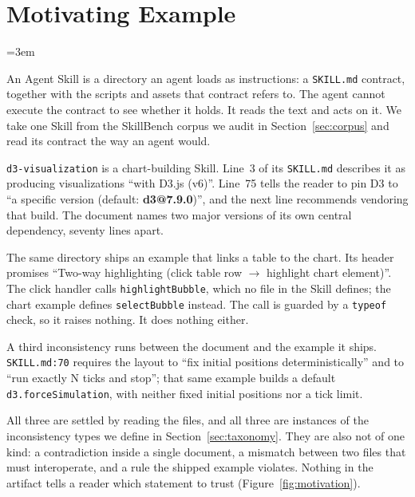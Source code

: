 \section{Motivating Example}
\label{sec:motivation}
%
\begingroup\emergencystretch=3em

An Agent Skill is a directory an agent loads as instructions: a \texttt{SKILL.md}
contract, together with the scripts and assets that contract refers to. The
agent cannot execute the contract to see whether it holds. It reads the text and
acts on it. We take one Skill from the SkillBench corpus we audit in
Section~\ref{sec:corpus} and read its contract the way an agent would.

\texttt{d3-visualization} is a chart-building Skill. Line~3 of its
\texttt{SKILL.md} describes it as producing visualizations ``with D3.js (v6)''.
Line~75 tells the reader to pin D3 to ``a specific version (default:
\textbf{d3@7.9.0})'', and the next line recommends vendoring that build. The
document names two major versions of its own central dependency, seventy lines
apart.

The same directory ships an example that links a table to the chart. Its header
promises ``Two-way highlighting (click table row $\rightarrow$ highlight chart
element)''. The click handler calls \texttt{highlightBubble}, which
no file in the Skill defines; the chart example defines
\texttt{selectBubble} instead. The call is guarded by a
\texttt{typeof} check, so it raises nothing. It does nothing either.

A third inconsistency runs between the document and the example it ships.
\texttt{SKILL.md:70} requires the layout to ``fix initial positions
deterministically'' and to ``run exactly N ticks and stop''; that same example
builds a default \texttt{d3.forceSimulation}, with neither fixed initial
positions nor a tick limit.

All three are settled by reading the files, and all three are instances of the
inconsistency types we define in Section~\ref{sec:taxonomy}. They are also not
of one kind: a contradiction inside a single document, a mismatch between two
files that must interoperate, and a rule the shipped example violates. Nothing in
the artifact tells a reader which statement to trust
(Figure~\ref{fig:motivation}).

